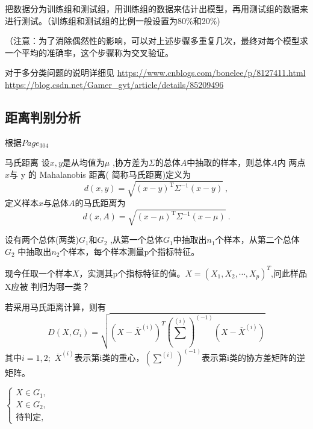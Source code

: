 \documentclass[12pt]{ctexart}
\numberwithin{equation}{section} %
\begin{document}
  把数据分为训练组和测试组，用训练组的数据来估计出模型，再用测试组的数据来进行测试。（训练组和测试组的比例一般设置为80\%和20\%)

  （注意：为了消除偶然性的影响，可以对上述步骤多重复几次，最终对每个模型求一个平均的准确率，这个步骤称为交叉验证。

  对于多分类问题的说明详细见
  \href{https://www.cnblogs.com/bonelee/p/8127411.html
}{https://www.cnblogs.com/bonelee/p/8127411.html}
\href{https://blog.csdn.net/Gamer_gyt/article/details/85209496}{https://blog.csdn.net/Gamer\_gyt/article/details/85209496}
\subsection{距离判别分析}
根据\cite{司守奎}$Page_{304}$
\begin{mydef}{马氏距离}
  设$x,y$是从均值为$\mu$ ,协方差为$\Sigma$的总体$A$中抽取的样本，则总体$A$内
两点$x$与 y 的 Mahalanobis 距离( 简称马氏距离)定义为
$$d(x,y)=\sqrt{(x-y)^{\mathrm{T}}\Sigma^{-1}(x-y)}\:,$$
定义样本$x$与总体$A$的马氏距离为
$$d(x,A)=\sqrt{(x-\mu)^{\mathrm{T}}\Sigma^{-1}(x-\mu)}\:.$$
\end{mydef}
设有两个总体(两类)$G_{1}$和$G_{2}$ ,从第一个总体$G_{1}$中抽取出$n_{1}$个样本，从第二个总体$G_{2}$
中抽取出$n_2$个样本，每个样本测量p个指标特征。

现今任取一个样本$X$，实测其p个指标特征的值。$X=(X_1,X_2,\cdots,X_p)^T$,问此样品X应被
判归为哪一类？

若采用马氏距离计算，则有
$$D(X,G_i)=\sqrt{(X-\overline{X}^{(i)})^T(\sum^{(i)})^{(-1)}(X-\overline{X}^{(i)})}$$
其中$i= 1, 2;$ $\overline {X}^{( i) }$表示第i类的重心，$\left(\sum^{(i)}\right)^{(-1)}$表示第i类的协方差矩阵的逆矩阵。

$\begin{cases}X\in G_1,\\X\in G_2,\\\text{待判定},&\end{cases}$
\end{document}
